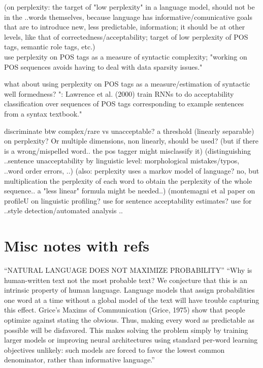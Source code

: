 (on perplexity: the target of "low perplexity" in a language model, should not be in the ..words themselves, because language has informative/comunicative goals that are to introduce new, less predictable, information; it should be at other levels, like that of correctedness/acceptability; target of low perplexity of POS tags, semantic role tags, etc.) \\
\citet{von2018pos} use perplexity on POS tags as a measure of syntactic complexity;
"working on POS sequences avoids having to deal with data sparsity issues." \citep{von2018pos}

what about using perplexity on POS tags as a measure/estimation of syntactic well formedness?
": Lawrence et al. (2000) train RNNs to do
acceptability classification over sequences of POS
tags corresponding to example sentences from a
syntax textbook."

discriminate btw complex/rare vs unacceptable? a threshold (linearly separable) on perplexity? Or multiple dimensions, non linearly, should be used?
(but if there is a wrong/mispelled word.. the pos tagger might misclassify it)
(distinguishing ..sentence unacceptability by linguistic level: morphological mistakes/typos, ..word order errors, ..)
(also: perplexity uses a markov model of language? no, but multiplication the perplexity of each word to obtain the perplexity of the whole sequence.. a "less linear" formula might be needed..)
(montemagni et al paper on profileU on linguistic profiling? use for sentence acceptability estimates? use for ..style detection/automated analysis ..


\section{Misc notes with refs}



“NATURAL LANGUAGE DOES NOT MAXIMIZE PROBABILITY” 
“Why is human-written text not the most probable text? We conjecture that this is an intrinsic property of human language. Language models that assign probabilities one word at a time without a global model of the text will have trouble capturing this effect. Grice’s Maxims of Communication (Grice, 1975) show that people optimize against stating the obvious. Thus, making every word as predictable as possible will be disfavored. This makes solving the problem simply by training larger models or improving neural architectures using standard per-word learning objectives unlikely: such models are forced to favor the lowest common denominator, rather than informative language.” 
\citep{holtzman2019curious}

